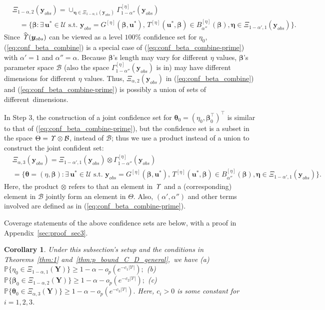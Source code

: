 \documentclass[12pt]{article}
\theoremstyle{shortspace}
\newtheorem{corollary}{Corollary}
\def\*#1{\bm{#1}}
\def\P{\mathbb P}
\begin{document}
\begin{align}
\label{eq:conf_beta_combine-prime}
& \Xi_{1-\alpha, 2}(\*y_{obs})  =  \cup_{\*\eta \in \Xi_{1-\alpha, 1}(\*y_{obs})} \Gamma_{1 -\alpha''}^{[\eta]}(\*y_{obs}) \nonumber \\
& \quad = \big\{\*\beta: \exists \, \*u^* \in {\mathcal U} \mbox{ s.t. }  \*y_{obs} = 
G^{[\eta]}(\*\beta, \*u^*),
\,  
T^{[\eta]}(\*u^*, \*\beta) \in B_{\alpha''}^{[\eta]}(\*\beta),  \*\eta \in \Xi_{1-\alpha', 1}(\*y_{obs}) \big\}. 
\end{align}
Since $\widehat{\it \Upsilon}(\*y_{obs})$ can be viewed as a level $100\%$ confidence set for $\eta_0$, (\ref{eq:conf_beta_combine}) 
is a special case of (\ref{eq:conf_beta_combine-prime}) with $\alpha' = 1$ and $\alpha'' = \alpha$. 
Because $\*\beta$'s length may vary for different $\eta$ values, $\*\beta$'s parameter space ${\mathcal B}$ (also the space $\Gamma_{1-\alpha''}^{[\eta]}(\*y_{obs})$ is in)  
may have different dimensions for different $\eta$ values. Thus, $\Xi_{\alpha,2}(\*y_{obs})$ in (\ref{eq:conf_beta_combine}) and (\ref{eq:conf_beta_combine-prime}) is possibly a union of sets of different~dimensions. 

In Step 3, the construction of a joint confidence set for $\*\theta_0 =(\eta_0, \*\beta_0^\top)^\top$
 is similar to that of (\ref{eq:conf_beta_combine-prime}), but the confidence set is a subset in the space $\Theta = {\it \Upsilon} \otimes {\mathcal B}$, instead of ${\mathcal B}$; thus we use a product instead of a union to construct the joint confident set:
\begin{align}
    \label{eq:conf_beta_combine-prime2}
& \Xi_{\alpha, 3}(\*y_{obs}) = \Xi_{1-\alpha', 1}(\*y_{obs}) 
\otimes \Gamma_{1-\alpha''}^{[\eta]}(\*y_{obs})  
\\ & = \big\{\*\theta = (\eta, \*\beta): \exists \, \*u^* \in {\mathcal U} \mbox{ s.t. }  \*y_{obs} = 
G^{[\eta]}(\*\beta, \*u^*),
\,  
T^{[\eta]}(\*u^*, \*\beta) \in B_{\alpha''}^{[\eta]}(\*\beta),  \*\eta \in \Xi_{1-\alpha', 1}(\*y_{obs}) \big\}. 
\nonumber 
\end{align}
Here, the product $\otimes$ refers to that an element in ${\it \Upsilon}$ and a (corresponding) element in ${\mathcal B}$ jointly form an element in $\Theta$.  
Also, $(\alpha', \alpha'')$ and other terms involved are defined as in (\ref{eq:conf_beta_combine-prime}). 

Coverage statements of the above confidence sets are below, with a proof in Appendix~\ref{sec:proof_sec3}. 
\begin{corollary}
\label{cor:3steps}
Under this subsection's setup and the conditions in  
Theorems~\ref{thm:1} and~\ref{thm:p_bound_C_D_general},~we have (a) $\P\{ \eta_0 \in \Xi_{1-\alpha, 1}(\*Y) \} \ge 1 -\alpha - o_p(e^{-c_1 |{\mathcal V}|});$
(b) $\P\{ \*\beta_0 \in \Xi_{1-\alpha, 2}(\*Y) \} \ge 1 - \alpha  - o_p(e^{-c_2 |{\mathcal V}|});$ 
(c) $\P\{ \*\theta_0 \in \Xi_{\alpha, 3}(\*Y) \} \ge 1 - \alpha - o_p(e^{-c_3 |{\mathcal V}|}).$ 
Here, $c_i > 0$ is some constant for~$i= 1,2,3$. 
\end{corollary}
 
\end{document}
